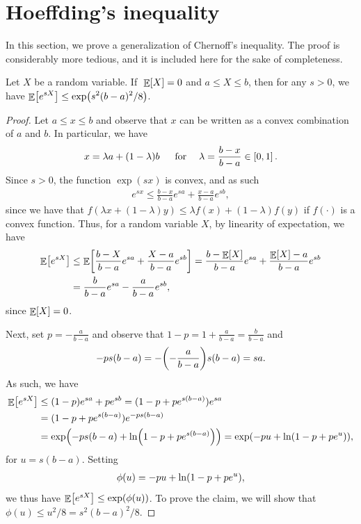 \section{Hoeffding's inequality}

In this section, we prove a generalization of Chernoff's
inequality. The proof is considerably more tedious, and it is included
here for the sake of completeness.

\begin{lemma}
    Let $X$ be a random variable.  If $\;\mathop{\mathbb{E}}\!\left[ {X} \right]=0$ and $a\le X\le b$,
    then for any $s > 0$, we have $\displaystyle \Ex{ e^{sX} } \le
    \exp\pth{ s^{2}(b-a)^{2} / 8 }$.

\end{lemma}
\begin{proof}
    Let $a\le x \le b$ and observe that $x$ can be written as a convex
    combination of $a$ and $b$. In particular, we have
    \begin{align*}
        x = \lambda a + (1-\lambda) b \text{\;\; ~ for ~\; } \lambda =
        \frac{b-x}{b-a} \in \left[ { 0,1 } \right].
    \end{align*}
    Since $s > 0$, the function $\exp(sx)$ is convex, and as such
    \begin{align*}
        e^{sx} \le \frac{b-x}{b-a} e^{sa} + \frac{x-a}{b-a} e^{sb},
    \end{align*}
    since we have that $f(\lambda x + (1-\lambda) y) \leq \lambda f(x)
    + (1-\lambda) f(y)$ if $f(\cdot)$ is a convex function.  Thus, for
    a random variable $X$, by linearity of expectation, we have
    \begin{align*}
        \Ex{e^{sX}}
        &\le \Ex{ \frac{b-X}{b-a} e^{sa} +
           \frac{X-a}{b-a} e^{sb}}
        = \frac{b - \Ex{X}}{b-a}e^{sa} + \frac{\Ex{X} -
           a}{b-a}{e^{sb}}%
        \\%
        &=%
        \frac{b }{b-a}e^{sa} - \frac{  a}{b-a}{e^{sb}},
    \end{align*}
    since $\mathop{\mathbb{E}}\!\left[ {X} \right] = 0$.


    Next, set $\displaystyle p = - \frac{a}{b-a}$ and observe that
    $\displaystyle 1-p = 1 + \frac{a}{b-a} = \frac{b}{b-a}$ and
    \begin{align*}
    -ps(b-a) = - \pth{- \frac{ a}{b-a}} s (b-a) = sa .
    \end{align*}
    As such, we have
    \begin{align*}
        \Ex{e^{sX}}%
        &\leq  (1-p)e^{sa} + p e^{sb}
        =%
        (1-p+p e^{s(b-a)}) e^{sa} \\
        &=%
        (1-p+p e^{s(b-a)}) e^{-ps(b-a)} \\%
        &=%
        \exp \pth{ -ps(b-a) + \ln\pth{ 1-p+p e^{s(b-a)} }}
        = \exp \pth{ -p u + \ln\pth{ 1-p+p e^{u} }},
    \end{align*}
    for $u = s(b-a)$. Setting
    \begin{align*}
        \phi(u) = -pu + \ln\pth{1-p+pe^{u}},
    \end{align*}
    we thus have $\Ex{e^{sX}} \leq \exp \pth{ \phi(u) }$.  To prove
    the claim, we will show that $\displaystyle \phi(u) \le {u^{2}} /
    {8} = {s^{2}(b-a)^{2}} / {8}$.


\end{proof}
